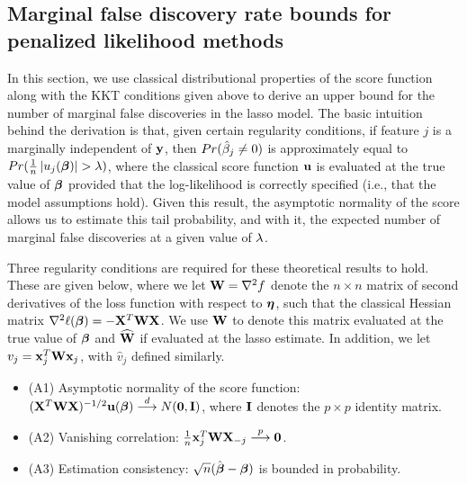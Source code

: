\subsection{Marginal false discovery rate bounds for penalized likelihood methods}
\label{Sec:main-results}

In this section, we use classical distributional properties of the score function along with the KKT conditions given above to derive an upper bound for the number of marginal false discoveries in the lasso model.
The basic intuition behind the derivation is that, given certain regularity conditions, if feature $j$ is a marginally independent of $\mathbf{y}$, then $Pr(\hat{\beta}_j \neq 0)$ is approximately equal to $Pr(\tfrac{1}{n}\left\lvert u_j(\boldsymbol{\beta})\right\rvert > \lambda)$, where the classical score function $\mathbf{u}$ is evaluated at the true value of $\boldsymbol{\beta}$ provided that the log-likelihood is correctly specified (i.e., that the model assumptions hold).
Given this result, the asymptotic normality of the score allows us to estimate this tail probability, and with it, the expected number of marginal false discoveries at a given value of $\lambda$.

Three regularity conditions are required for these theoretical results to hold.
These are given below, where we let $\mathbf{W} = \nabla^2f$ denote the $n \times n$
matrix of second derivatives of the loss function with respect to $\boldsymbol{\eta}$, such
that the classical Hessian matrix $\nabla^2 \ell (\boldsymbol{\beta}) = -\mathbf{X}^T\mathbf{W}\mathbf{X}$.  We use
$\mathbf{W}$ to denote this matrix evaluated at the true value of $\boldsymbol{\beta}$ and $\widehat{\mathbf{W}}$
if evaluated at the lasso estimate.  In addition, we let $v_j=\mathbf{x}_j^T\mathbf{W}\mathbf{x}_j$,
with $\hat{v}_j$ defined similarly.

\begin{itemize}
\item (A1) Asymptotic normality of the score function: $(\mathbf{X}^T\mathbf{W}\mathbf{X})^{-1/2}\mathbf{u}(\boldsymbol{\beta}) \overset{d}{\longrightarrow} N(\mathbf{0},  \mathbf{I})$, where $\mathbf{I}$ denotes the $p \times p$ identity matrix.
\item (A2) Vanishing correlation: $\frac{1}{n}\mathbf{x}_j^T\mathbf{W}\mathbf{X}_{-j} \overset{p}{\longrightarrow} \mathbf{0}$.
\item (A3) Estimation consistency: $\sqrt{n}(\hat{\boldsymbol{\beta}}-  \boldsymbol{\beta})$ is bounded in probability.
\end{itemize}

